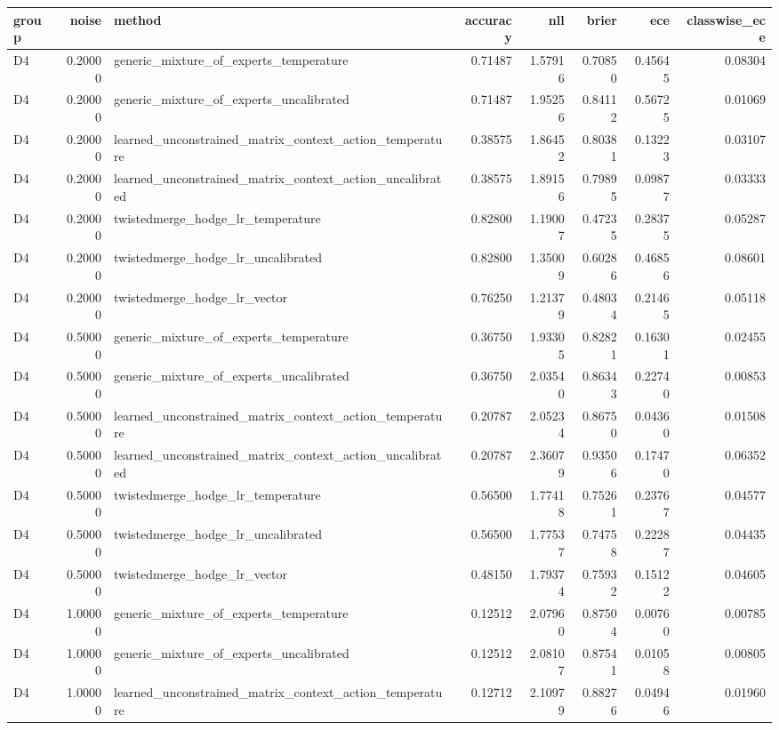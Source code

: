 \begin{tabular}{lrlrrrrr}
\toprule
group & noise & method & accuracy & nll & brier & ece & classwise_ece \\
\midrule
D4 & 0.20000 & generic_mixture_of_experts_temperature & 0.71487 & 1.57916 & 0.70850 & 0.45645 & 0.08304 \\
D4 & 0.20000 & generic_mixture_of_experts_uncalibrated & 0.71487 & 1.95256 & 0.84112 & 0.56725 & 0.01069 \\
D4 & 0.20000 & learned_unconstrained_matrix_context_action_temperature & 0.38575 & 1.86452 & 0.80381 & 0.13223 & 0.03107 \\
D4 & 0.20000 & learned_unconstrained_matrix_context_action_uncalibrated & 0.38575 & 1.89156 & 0.79895 & 0.09877 & 0.03333 \\
D4 & 0.20000 & twistedmerge_hodge_lr_temperature & 0.82800 & 1.19007 & 0.47235 & 0.28375 & 0.05287 \\
D4 & 0.20000 & twistedmerge_hodge_lr_uncalibrated & 0.82800 & 1.35009 & 0.60286 & 0.46856 & 0.08601 \\
D4 & 0.20000 & twistedmerge_hodge_lr_vector & 0.76250 & 1.21379 & 0.48034 & 0.21465 & 0.05118 \\
D4 & 0.50000 & generic_mixture_of_experts_temperature & 0.36750 & 1.93305 & 0.82821 & 0.16301 & 0.02455 \\
D4 & 0.50000 & generic_mixture_of_experts_uncalibrated & 0.36750 & 2.03540 & 0.86343 & 0.22740 & 0.00853 \\
D4 & 0.50000 & learned_unconstrained_matrix_context_action_temperature & 0.20787 & 2.05234 & 0.86750 & 0.04360 & 0.01508 \\
D4 & 0.50000 & learned_unconstrained_matrix_context_action_uncalibrated & 0.20787 & 2.36079 & 0.93506 & 0.17470 & 0.06352 \\
D4 & 0.50000 & twistedmerge_hodge_lr_temperature & 0.56500 & 1.77418 & 0.75261 & 0.23767 & 0.04577 \\
D4 & 0.50000 & twistedmerge_hodge_lr_uncalibrated & 0.56500 & 1.77537 & 0.74758 & 0.22287 & 0.04435 \\
D4 & 0.50000 & twistedmerge_hodge_lr_vector & 0.48150 & 1.79374 & 0.75932 & 0.15122 & 0.04605 \\
D4 & 1.00000 & generic_mixture_of_experts_temperature & 0.12512 & 2.07960 & 0.87504 & 0.00760 & 0.00785 \\
D4 & 1.00000 & generic_mixture_of_experts_uncalibrated & 0.12512 & 2.08107 & 0.87541 & 0.01058 & 0.00805 \\
D4 & 1.00000 & learned_unconstrained_matrix_context_action_temperature & 0.12712 & 2.10979 & 0.88276 & 0.04946 & 0.01960 \\

\end{tabular}
